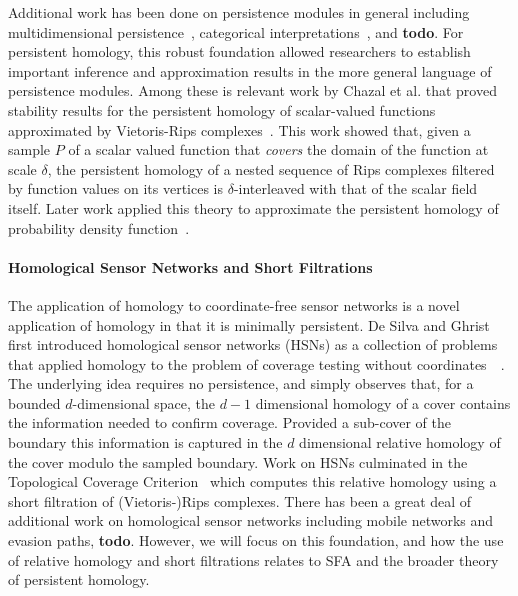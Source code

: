 Additional work has been done on persistence modules in general including multidimensional persistence~\cite{carlsson2009theory,carlsson2009computing,lesnick2015theory}, categorical interpretations~\cite{todo}, and \textbf{todo}.
For persistent homology, this robust foundation allowed researchers to establish important inference and approximation results in the more general language of persistence modules.
Among these is relevant work by Chazal et al. that proved stability results for the persistent homology of scalar-valued functions approximated by Vietoris-Rips complexes~\cite{chazal09analysis}.
This work showed that, given a sample $P$ of a scalar valued function that \emph{covers} the domain of the function at scale $\delta$, the persistent homology of a nested sequence of Rips complexes filtered by function values on its vertices is $\delta$-interleaved with that of the scalar field itself.
Later work applied this theory to approximate the persistent homology of probability density function~\cite{chazal2013persistence}.

\paragraph{Homological Sensor Networks and Short Filtrations}

The application of homology to coordinate-free sensor networks is a novel application of homology in that it is minimally persistent.
De Silva and Ghrist first introduced homological sensor networks (HSNs) as a collection of problems that applied homology to the problem of coverage testing without coordinates~~\cite{desilva06coordinate,desilva07homological}.
The underlying idea requires no persistence, and simply observes that, for a bounded $d$-dimensional space, the $d-1$ dimensional homology of a cover contains the information needed to confirm coverage.
Provided a sub-cover of the boundary this information is captured in the $d$ dimensional relative homology of the cover modulo the sampled boundary.
Work on HSNs culminated in the Topological Coverage Criterion~\cite{desilva07coverage} which computes this relative homology using a short filtration of (Vietoris-)Rips complexes.
There has been a great deal of additional work on homological sensor networks including mobile networks and evasion paths, \textbf{todo}.
However, we will focus on this foundation, and how the use of relative homology and short filtrations relates to SFA and the broader theory of persistent homology.

